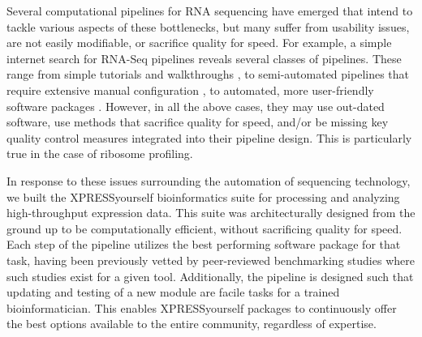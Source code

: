 \documentclass[10pt, oneside]{article}
\begin{document}
Several computational pipelines for RNA sequencing have emerged that intend to tackle various aspects of these bottlenecks, but many suffer from usability issues, are not easily modifiable, or sacrifice quality for speed. For example, a simple internet search for RNA-Seq pipelines reveals several classes of pipelines. These range from simple tutorials and walkthroughs \cite{encode_pipeline, gdc_pipeline}, to semi-automated pipelines that require extensive manual configuration \cite{pavlidis_pipeline, nfcore_pipeline, umcu_pipeline, cellgeni_pipeline}, to automated, more user-friendly software packages \cite{dnanexus_pipeline, nextflow_pipeline, galaxy}. However, in all the above cases, they may use out-dated software, use methods that sacrifice quality for speed, and/or be missing key quality control measures integrated into their pipeline design. This is particularly true in the case of ribosome profiling. \par

In response to these issues surrounding the automation of sequencing technology, we built the XPRESSyourself bioinformatics suite for processing and analyzing high-throughput expression data. This suite was architecturally designed from the ground up to be computationally efficient, without sacrificing quality for speed. Each step of the pipeline utilizes the best performing software package for that task, having been previously vetted by peer-reviewed benchmarking studies where such studies exist for a given tool. Additionally, the pipeline is designed such that updating and testing of a new module are facile tasks for a trained bioinformatician. This enables XPRESSyourself packages to continuously offer the best options available to the entire community, regardless of expertise. \par
\end{document}
